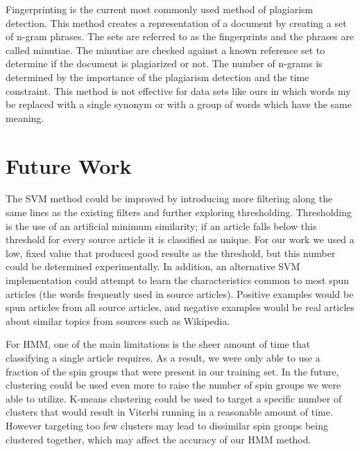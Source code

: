 \documentclass[11pt,letterpaper,oneside, titlepage]{scrartcl}
\begin{document}

Fingerprinting is the current most commonly used method of plagiarism detection. This method creates a representation of a document by creating a set of n-gram phrases. The sets are referred to as the fingerprints and the phrases are called minutiae. The minutiae are checked against a known reference set to determine if the document is plagiarized or not. The number of n-grams is determined by the importance of the plagiarism detection and the time constraint. This method is not effective for data sets like ours in which words my be replaced with a single synonym or with a group of words which have the same meaning.

\section{Future Work}
The SVM method could be improved by introducing more filtering along the same lines as the existing filters and further exploring thresholding.  Thresholding is the use of an artificial minimum similarity; if an article falls below this threshold for every source article it is classified as unique.  For our work we used a low, fixed value that produced good results as the threshold, but this number could be determined experimentally.  In addition, an alternative SVM implementation could attempt to learn the characteristics common to most spun articles (the words frequently used in source articles).  Positive examples would be spun articles from all source articles, and negative examples would be real articles about similar topics from sources such as Wikipedia.

For HMM, one of the main limitations is the sheer amount of time that classifying a single article requires. As a result, we were only able to use a fraction of the spin groups that were present in our training set. In the future, clustering could be used even more to raise the number of spin groups we were able to utilize. K-means clustering could be used to target a specific number of clusters that would result in Viterbi running in a reasonable amount of time. However targeting too few clusters may lead to dissimilar spin groups being clustered together, which may affect the accuracy of our HMM method.
\end{document}
